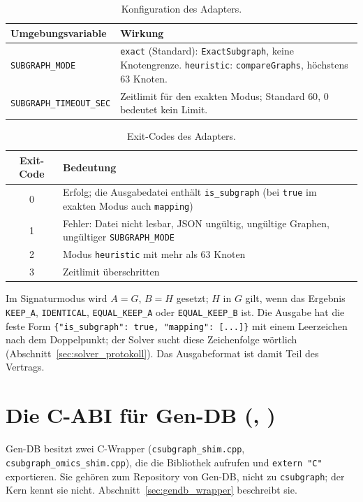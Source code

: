 \begin{table}[!ht]
	\centering
	\small
	\begin{tabularx}{\textwidth}{@{}L{4.6cm}Y@{}}
		\toprule
		Umgebungsvariable & Wirkung \\
		\midrule
		\texttt{SUBGRAPH\_MODE} & \texttt{exact} (Standard): \texttt{ExactSubgraph}, keine Knotengrenze. \texttt{heuristic}: \texttt{compareGraphs}, höchstens $63$ Knoten. \\
		\texttt{SUBGRAPH\_TIMEOUT\_SEC} & Zeitlimit für den exakten Modus; Standard $60$, $0$ bedeutet kein Limit. \\
		\bottomrule
	\end{tabularx}
	\caption{Konfiguration des Adapters.}
	\label{tab:adapter_env}
\end{table}

\begin{table}[!ht]
	\centering
	\small
	\begin{tabularx}{\textwidth}{@{}cY@{}}
		\toprule
		Exit-Code & Bedeutung \\
		 & Erfolg; die Ausgabedatei enthält \texttt{is\_subgraph} (bei \texttt{true} im exakten Modus auch \texttt{mapping}) \\
		1 & Fehler: Datei nicht lesbar, JSON ungültig, ungültige Graphen, ungültiger \texttt{SUBGRAPH\_MODE} \\
		2 & Modus \texttt{heuristic} mit mehr als $63$ Knoten \\
		3 & Zeitlimit überschritten \\
		\bottomrule
	\end{tabularx}
	\caption{Exit-Codes des Adapters.}
	\label{tab:adapter_exit}
\end{table}

Im Signaturmodus wird $A=G$, $B=H$ gesetzt; $H$ in $G$ gilt, wenn das Ergebnis \texttt{KEEP\_A}, \texttt{IDENTICAL}, \texttt{EQUAL\_KEEP\_A} oder \texttt{EQUAL\_KEEP\_B} ist. Die Ausgabe hat die feste Form \texttt{\{"is\_subgraph": true, "mapping": [...]\}} mit einem Leerzeichen nach dem Doppelpunkt; der Solver sucht diese Zeichenfolge wörtlich (Abschnitt~\ref{sec:solver_protokoll}). Das Ausgabeformat ist damit Teil des Vertrags.

\section{Die C-ABI für Gen-DB (, )}

Gen-DB besitzt zwei C-Wrapper (\texttt{csubgraph\_shim.cpp}, \texttt{csubgraph\_omics\_shim.cpp}), die die Bibliothek aufrufen und \texttt{extern "C"} exportieren. Sie gehören zum Repository von Gen-DB, nicht zu \texttt{csubgraph}; der Kern kennt sie nicht. Abschnitt~\ref{sec:gendb_wrapper} beschreibt sie.

